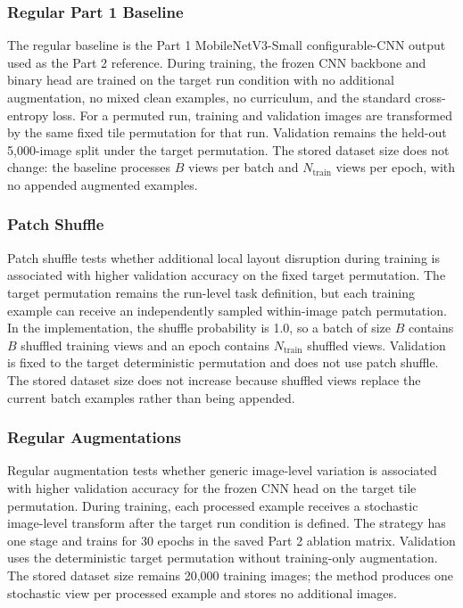 \documentclass[12pt]{article}
\begin{document}
\subsubsection{Regular Part 1 Baseline}

The regular baseline is the Part 1 MobileNetV3-Small configurable-CNN output used as the Part 2 reference. During training, the frozen CNN backbone and binary head are trained on the target run condition with no additional augmentation, no mixed clean examples, no curriculum, and the standard cross-entropy loss. For a permuted run, training and validation images are transformed by the same fixed tile permutation for that run. Validation remains the held-out 5,000-image split under the target permutation. The stored dataset size does not change: the baseline processes $B$ views per batch and $N_{\mathrm{train}}$ views per epoch, with no appended augmented examples.

\subsubsection{Patch Shuffle}

Patch shuffle tests whether additional local layout disruption during training is associated with higher validation accuracy on the fixed target permutation. The target permutation remains the run-level task definition, but each training example can receive an independently sampled within-image patch permutation. In the implementation, the shuffle probability is 1.0, so a batch of size $B$ contains $B$ shuffled training views and an epoch contains $N_{\mathrm{train}}$ shuffled views. Validation is fixed to the target deterministic permutation and does not use patch shuffle. The stored dataset size does not increase because shuffled views replace the current batch examples rather than being appended.

\subsubsection{Regular Augmentations}

Regular augmentation tests whether generic image-level variation is associated with higher validation accuracy for the frozen CNN head on the target tile permutation. During training, each processed example receives a stochastic image-level transform after the target run condition is defined. The strategy has one stage and trains for 30 epochs in the saved Part 2 ablation matrix. Validation uses the deterministic target permutation without training-only augmentation. The stored dataset size remains 20,000 training images; the method produces one stochastic view per processed example and stores no additional images.
\end{document}
